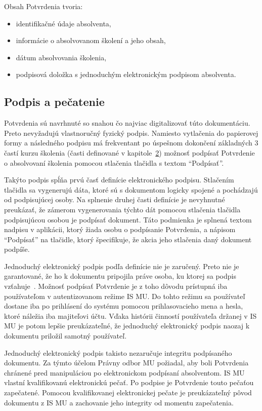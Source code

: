 \documentclass[
  digital,     %
  oneside,     %
  nosansbold,  %
  nocolorbold, %
  lof,         %
  nolot,         %
]{fithesis4}
\begin{document}
Obsah Potvrdenia tvoria:

\begin{itemize}
  \item identifikačné údaje absolventa,
  \item informácie o absolvovanom školení a jeho obsah,
  \item dátum absolvovania školenia,
  \item podpisová doložka s jednoduchým elektronickým podpisom absolventa.
\end{itemize}

\subsection*{Podpis a pečatenie}
Potvrdenia sú navrhnuté so snahou čo najviac digitalizovať túto dokumentáciu. Preto nevyžadujú vlastnoručný fyzický podpis. Namiesto vytlačenia do papierovej formy a následného podpisu má frekventant po úspešnom dokončení základných 3 častí kurzu školenia (časti definované v kapitole~\hyperref[kap-2]{2}) možnosť podpísať Potvrdenie o absolvovaní školenia pomocou stlačenia tlačidla s textom \enquote{Podpísať}. 

Takýto podpis spĺňa prvú časť definície elektronického podpisu. Stlačením tlačidla sa vygenerujú dáta, ktoré sú s dokumentom logicky spojené a pochádzajú od podpisujúcej osoby. Na splnenie druhej časti definície je nevyhnutné preukázať, že zámerom vygenerovania týchto dát pomocou stlačenia tlačidla podpisujúcou osobou je podpísať dokument. Táto podmienka je splnená textom nadpisu v aplikácii, ktorý žiada osobu o podpísanie Potvrdenia, a nápisom \enquote{Podpísať} na tlačidle, ktorý špecifikuje, že akcia jeho stlačenia daný dokument podpíše.

Jednoduchý elektronický podpis podľa definície nie je zaručený. Preto nie je garantované, že ho k dokumentu pripojila práve osoba, ku ktorej sa podpis vzťahuje~\cite{navara2021}. Možnosť podpísať Potvrdenie je z toho dôvodu prístupná iba používateľom v autentizovanom režime IS MU. Do tohto režimu sa používateľ dostane iba po prihlásení do systému pomocou prihlasovacieho mena a hesla, ktoré náležia iba majiteľovi účtu. Vďaka histórii činností používateľa držanej v IS MU je potom lepšie preukázateľné, že jednoduchý elektronický podpis naozaj k dokumentu priložil samotný používateľ.

Jednoduchý elektronický podpis takisto nezaručuje integritu podpísaného dokumentu. Za týmto účelom Právny odbor MU požiadal, aby boli Potvrdenia chránené pred manipuláciou po elektronickom podpísaní absolventom. IS MU vlastní kvalifikovanú elektronickú pečať. Po podpise je Potvrdenie touto pečaťou zapečatené. Pomocou kvalifikovanej elektronickej pečate je preukázateľný pôvod dokumentu z IS MU a zachovanie jeho integrity od momentu zapečatenia.
\end{document}
